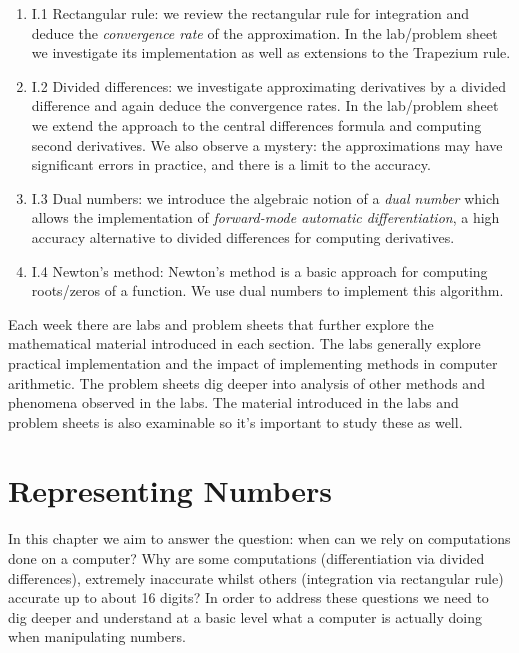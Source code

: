 \documentclass[12pt,a4paper]{book}
\theoremstyle{definition}
\begin{document}
\begin{enumerate}
\item I.1 Rectangular rule: we review the rectangular rule for integration and deduce the {\it convergence rate} of the approximation. In the lab/problem sheet  we investigate its implementation as well as extensions to the Trapezium rule.
\item I.2 Divided differences: we investigate approximating derivatives by a divided difference and again deduce the convergence rates. In the lab/problem sheet we extend the approach to the central differences formula and computing second derivatives. We also observe a mystery: the approximations may have significant errors in practice, and there is a limit to the accuracy.
\item I.3 Dual numbers: we introduce the algebraic notion of a {\it dual number} which allows the implementation of {\it forward-mode automatic differentiation}, a high accuracy alternative to divided differences for computing derivatives.
\item I.4 Newton's method: Newton's method is a basic approach for computing roots/zeros of a function. We use dual numbers to implement this algorithm.
\end{enumerate}


Each week there are labs and problem sheets that further explore the mathematical material introduced in each section. The labs generally explore practical implementation and the impact of implementing methods in computer arithmetic. The problem sheets dig deeper into analysis of other methods and phenomena observed in the labs. The material introduced in the labs and problem sheets is also examinable so it's important to study these as well.






\chapter{Representing Numbers}

In this chapter we aim to answer the question: when can we rely on computations done on a computer?  Why are some computations (differentiation via divided differences), extremely inaccurate whilst others (integration via rectangular rule) accurate up to about 16 digits?  In order to address these questions we need to dig deeper and understand at a basic level what a computer is actually doing when manipulating numbers.
\end{document}
